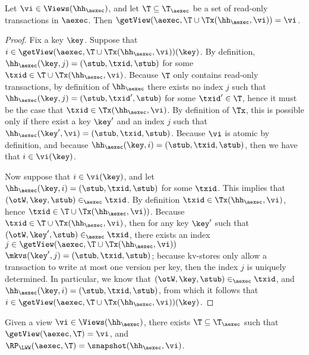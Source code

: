 \begin{proposition}
\label{prop:getview.tx}
Let $\vi \in \Views(\hh_{\aexec})$, and let $\T \subseteq \T_{\aexec}$ be a 
set of read-only transactions in $\aexec$. Then 
$\getView(\aexec, \T \cup \Tx(\hh_{\aexec}, \vi)) = \vi$. 
\end{proposition}

\begin{proof}
Fix a key $\key$. Suppose that $i \in \getView(\aexec, \T \cup \Tx(\hh_{\aexec}, \vi))(\key)$. 
By definition, $\hh_{\aexec}(\key, j) = (\stub, \txid, \stub)$ for some $\txid \in \T \cup \Tx(\hh_{\aexec}, \vi)$. 
Because $\T$ only contains read-only transactions, by definition of $\hh_{\aexec}$ there exists 
no index $j$ such that $\hh_{\aexec}(\key, j) = (\stub, \txid', \stub)$ for some $\txid' \in \T$, 
hence it must be the case that $\txid \in \Tx(\hh_{\aexec}, \vi)$. By definition of $\Tx$, 
this is possible only if there exist a key $\key'$ and an index $j$ such that $\hh_{\aexec}(\key', \vi) = (\stub, \txid, \stub)$. 
Because $\vi$ is atomic by definition, and because $\hh_{\aexec}(\key, i) = (\stub, \txid, \stub)$, then we have that $i \in \vi(\key)$. 

Now suppose that $i \in \vi(\key)$, and let $\hh_{\aexec}(\key, i) = (\stub, \txid, \stub)$ for some $\txid$. 
This implies that $(\otW, \key, \stub) \in_{\aexec} \txid$.
By definition $\txid \in \Tx(\hh_{\aexec}, \vi)$, hence $\txid \in \T \cup \Tx(\hh_{\aexec}, \vi))$. 
Because $\txid \in \T \cup \Tx(\hh_{\aexec}, \vi)$, then for any key $\key'$ such that 
$(\otW, \key', \stub) \in_{\aexec} \txid$, there exists an index $j \in \getView(\aexec, \T \cup \Tx(\hh_{\aexec}, \vi))$ 
$\mkvs(\key', j) = (\stub, \txid, \stub)$; because kv-stores only allow a transaction to write at most one version 
per key, then the index $j$ is uniquely determined. In particular, we know that $(\otW, \key, \stub) \in_{\aexec} \txid$, 
and $\hh_{\aexec}(\key, i) = (\stub, \txid, \stub)$, from which it follows that $i \in \getView(\aexec, \T \cup \Tx(\hh_{\aexec}, \vi))(\key)$.
\end{proof}


\begin{proposition}
\label{prop:compatible.kv2aexec}
Given a view $\vi \in \Views(\hh_{\aexec})$, there exists $\T \subseteq \T_{\aexec}$ 
such that $\getView(\aexec, \T) = \vi$, and $\RP_{\LWW}(\aexec, \T) = \snapshot(\hh_{\aexec}, \vi)$.
\end{proposition}

